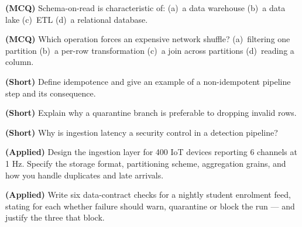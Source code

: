 \begin{reviewq}
  \item \textbf{(MCQ)} Schema-on-read is characteristic of: (a)~a data warehouse
        (b)~a data lake (c)~ETL (d)~a relational database.
  \item \textbf{(MCQ)} Which operation forces an expensive network shuffle?
        (a)~filtering one partition (b)~a per-row transformation (c)~a join across
        partitions (d)~reading a column.
  \item \textbf{(Short)} Define idempotence and give an example of a non-idempotent
        pipeline step and its consequence.
  \item \textbf{(Short)} Explain why a quarantine branch is preferable to dropping
        invalid rows.
  \item \textbf{(Short)} Why is ingestion latency a security control in a detection
        pipeline?
  \item \textbf{(Applied)} Design the ingestion layer for 400 IoT devices reporting
        6 channels at 1 Hz. Specify the storage format, partitioning scheme,
        aggregation grains, and how you handle duplicates and late arrivals.
  \item \textbf{(Applied)} Write six data-contract checks for a nightly student
        enrolment feed, stating for each whether failure should warn, quarantine or
        block the run --- and justify the three that block.
\end{reviewq}
